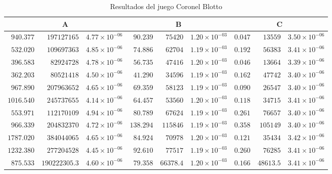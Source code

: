 \begin{table}[ht]
   \scriptsize
    \centering
    \begin{tabular}{r r r | r r r | r r r}
    \multicolumn{3}{c}{A} & \multicolumn{3}{c}{B} & \multicolumn{3}{c}{C} \\ \hline
	$940.377$ & $197127165$ & $4.77 {\times} 10^{-06}$ & $90.239$ & $75420$ & $1.20 {\times} 10^{-03}$ & $0.047$ & $13559$ & $3.50 {\times} 10^{-06}$ \\
	$532.020$ & $109697363$ & $4.85 {\times} 10^{-06}$ & $74.886$ & $62704$ & $1.19 {\times} 10^{-03}$ & $0.192$ & $56383$ & $3.41 {\times} 10^{-06}$ \\
	$396.583$ & $82924728$ & $4.78 {\times} 10^{-06}$ & $56.735$ & $47416$ & $1.20 {\times} 10^{-03}$ & $0.046$ & $13664$ & $3.39 {\times} 10^{-06}$ \\
	$362.203$ & $80521418$ & $4.50 {\times} 10^{-06}$ & $41.290$ & $34596$ & $1.19 {\times} 10^{-03}$ & $0.162$ & $47742$ & $3.40 {\times} 10^{-06}$ \\
	$967.890$ & $207963652$ & $4.65 {\times} 10^{-06}$ & $69.359$ & $58123$ & $1.19 {\times} 10^{-03}$ & $0.090$ & $26547$ & $3.40 {\times} 10^{-06}$ \\
	$1016.540$ & $245737655$ & $4.14 {\times} 10^{-06}$ & $64.457$ & $53560$ & $1.20 {\times} 10^{-03}$ & $0.118$ & $34715$ & $3.41 {\times} 10^{-06}$ \\
	$553.971$ & $112170109$ & $4.94 {\times} 10^{-06}$ & $80.789$ & $67624$ & $1.19 {\times} 10^{-03}$ & $0.261$ & $76657$ & $3.40 {\times} 10^{-06}$ \\
	$966.339$ & $204832370$ & $4.72 {\times} 10^{-06}$ & $138.294$ & $115846$ & $1.19 {\times} 10^{-03}$ & $0.358$ & $105149$ & $3.40 {\times} 10^{-06}$ \\
	$1787.020$ & $384044065$ & $4.65 {\times} 10^{-06}$ & $84.924$ & $70978$ & $1.20 {\times} 10^{-03}$ & $0.121$ & $35434$ & $3.42 {\times} 10^{-06}$ \\
	$1232.380$ & $277204528$ & $4.45 {\times} 10^{-06}$ & $92.610$ & $77517$ & $1.19 {\times} 10^{-03}$ & $0.260$ & $76285$ & $3.41 {\times} 10^{-06}$ \\ \hline
	$875.533$ & $190222305.3$ & $4.60 {\times} 10^{-06}$ & $79.358$ & $66378.4$ & $1.20 {\times} 10^{-03}$ & $0.166$ & $48613.5$ & $3.41 {\times} 10^{-06}$ \\ \hline
    \end{tabular}
    \caption{Resultados del juego Coronel Blotto}
    \label{tab:resultados-coronel-blotto}
\end{table}


